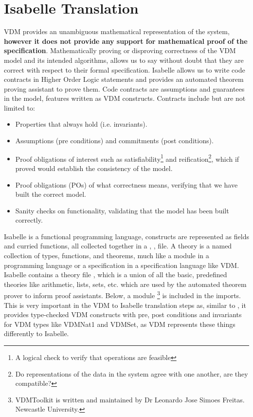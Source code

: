 \section{Isabelle Translation}
VDM provides an unambiguous mathematical representation of the system, \textbf{however it does not provide any support for mathematical proof of the specification}. Mathematically proving or disproving correctness of the VDM model and its intended algorithms, allows us to say without doubt that they are correct with respect to their formal specification. Isabelle allows us to write code contracts in Higher Order Logic statements and provides an automated theorem proving assistant to prove them. Code contracts are assumptions and guarantees in the model, features written as VDM constructs. Contracts include but are not limited to: \begin{itemize}
  \item Properties that always hold (i.e. invariants).
  \item Assumptions (pre conditions) and commitments (post conditions).
  \item Proof obligations of interest such as satisfiability\footnote{A logical check to verify that operations are feasible} and reification\footnote{Do representations of the data in the system agree with one another, are they compatible?}, which if proved would establish the consistency of the model.
  \item Proof obligations (POs) of what correctness means, verifying that we have built the correct model.
  \item Sanity checks on functionality, validating that the model has been built correctly.
\end{itemize}
Isabelle is a functional programming language, constructs are represented as fields and curried functions, all collected together in a , , file. A theory is a named collection of types, functions, and theorems, much like a module in a programming language or a specification in a specification language like VDM. Isabelle contains a theory file , which is a union of all the basic, predefined theories like arithmetic, lists, sets, etc. which are used by the automated theorem prover to inform proof assistants. Below, a module \footnote{VDMToolkit is written and maintained by Dr Leonardo Jose Simoes Freitas. Newcastle University.} is included in the imports. This is very important in the VDM to Isabelle translation steps as, similar to , it provides type-checked VDM constructs with pre, post conditions and invariants for VDM types like VDMNat1 and VDMSet, as VDM represents these things differently to Isabelle.

